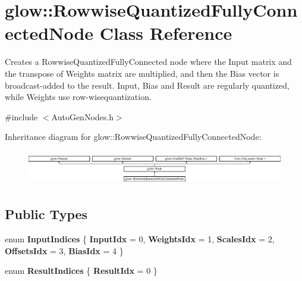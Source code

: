 \hypertarget{classglow_1_1_rowwise_quantized_fully_connected_node}{}\section{glow\+:\+:Rowwise\+Quantized\+Fully\+Connected\+Node Class Reference}
\label{classglow_1_1_rowwise_quantized_fully_connected_node}


Creates a Rowwise\+Quantized\+Fully\+Connected node where the Input matrix and the transpose of Weights matrix are multiplied, and then the Bias vector is broadcast-\/added to the result. Input, Bias and Result are regularly quantized, while Weights use row-\/wisequantization.  




{\ttfamily \#include $<$Auto\+Gen\+Nodes.\+h$>$}

Inheritance diagram for glow\+:\+:Rowwise\+Quantized\+Fully\+Connected\+Node\+:\begin{figure}[H]
\begin{center}
\leavevmode
\includegraphics[height=1.516245cm]{classglow_1_1_rowwise_quantized_fully_connected_node}
\end{center}
\end{figure}
\subsection*{Public Types}
\begin{DoxyCompactItemize}
\item 
\mbox{\label{classglow_1_1_rowwise_quantized_fully_connected_node_a16845e8f72ad2ad857119d49f4ed100b}} 
enum {\bfseries Input\+Indices} \{ \newline
{\bfseries Input\+Idx} = 0, 
{\bfseries Weights\+Idx} = 1, 
{\bfseries Scales\+Idx} = 2, 
{\bfseries Offsets\+Idx} = 3, 
\newline
{\bfseries Bias\+Idx} = 4
 \}
\item 
\mbox{\label{classglow_1_1_rowwise_quantized_fully_connected_node_aa1685baca4cc5623a18c22f3c95d9eb2}} 
enum {\bfseries Result\+Indices} \{ {\bfseries Result\+Idx} = 0
 \}
\end{DoxyCompactItemize}
